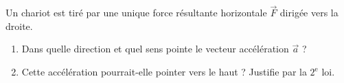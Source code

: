 \documentclass[11pt,a4paper]{article}
\newcommand{\vv}[1]{\vec{#1}}\newcommand{\ds}{\displaystyle}
\begin{document}
\begin{exo}
Un chariot est tiré par une unique force résultante horizontale $\vv F$ dirigée vers la droite.
\begin{enumerate}[label=\alph*)]
  \item Dans quelle direction et quel sens pointe le vecteur accélération $\vv a$ ?
  \item Cette accélération pourrait-elle pointer vers le haut ? Justifie par la $2^{\text{e}}$ loi.
\end{enumerate}
\end{exo}
\end{document}
